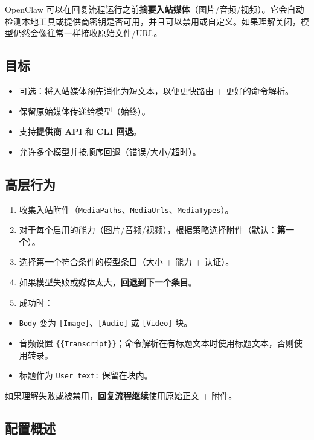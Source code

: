OpenClaw 可以在回复流程运行之前\textbf{摘要入站媒体}（图片/音频/视频）。它会自动检测本地工具或提供商密钥是否可用，并且可以禁用或自定义。如果理解关闭，模型仍然会像往常一样接收原始文件/URL。

\subsection{目标}


\begin{itemize}
  \item 可选：将入站媒体预先消化为短文本，以便更快路由 + 更好的命令解析。
  \item 保留原始媒体传递给模型（始终）。
  \item 支持\textbf{提供商 API} 和 \textbf{CLI 回退}。
  \item 允许多个模型并按顺序回退（错误/大小/超时）。
\end{itemize}


\subsection{高层行为}


\begin{enumerate}
  \item 收集入站附件（\texttt{MediaPaths}、\texttt{MediaUrls}、\texttt{MediaTypes}）。
  \item 对于每个启用的能力（图片/音频/视频），根据策略选择附件（默认：\textbf{第一个}）。
  \item 选择第一个符合条件的模型条目（大小 + 能力 + 认证）。
  \item 如果模型失败或媒体太大，\textbf{回退到下一个条目}。
  \item 成功时：
\end{enumerate}

\begin{itemize}
  \item \texttt{Body} 变为 \texttt{[Image]}、\texttt{[Audio]} 或 \texttt{[Video]} 块。
  \item 音频设置 \texttt{\{\{Transcript\}\}}；命令解析在有标题文本时使用标题文本，否则使用转录。
  \item 标题作为 \texttt{User text:} 保留在块内。
\end{itemize}


如果理解失败或被禁用，\textbf{回复流程继续}使用原始正文 + 附件。

\subsection{配置概述}


